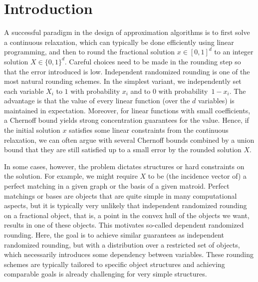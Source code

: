 \section{Introduction}
\label{sec:introduction}
A successful paradigm in the design of approximation algorithms
is to first solve a continuous relaxation, which can
typically be done efficiently using
linear programming, and then to round the 
fractional solution $x\in [0,1]^d$
to an integer solution $X\in\{0,1\}^d$. 
Careful choices need to be made in the rounding step
so that the error introduced is low.
Independent randomized rounding is one of the most natural
rounding schemes. In the simplest variant, we independently
set each variable $X_i$ to $1$ with probability $x_i$ and
to $0$ with probability~$1 - x_i$.
The advantage is that the value of every linear function
(over the $d$ variables) is maintained in expectation.
Moreover, for linear functions with small coefficients,
a Chernoff bound yields strong concentration guarantees
for the value.
Hence, if the initial solution $x$ satisfies some linear 
constraints from the continuous relaxation, we can often
argue with several Chernoff bounds combined by a union bound that 
they are still satisfied up to a small error by the
rounded solution $X$.

In some cases, however, the problem dictates structures or
hard constraints on the solution. For example, we might
require $X$ to be (the incidence vector of) a perfect matching
in a given graph or the basis of a given matroid.
Perfect matchings or bases are objects
that are quite simple in many computational aspects,
but it is typically very unlikely that independent
randomized rounding on a fractional object,
that is, a point in the convex hull of the objects we
want, results in one of these objects.
This motivates so-called dependent randomized rounding.
Here, the goal is to achieve similar guarantees
as independent randomized rounding, but with a distribution over a restricted set of objects,
which necessarily introduces some dependency between
variables.
These rounding schemes are typically tailored to specific
object structures and achieving comparable goals is already challenging for very simple structures.

